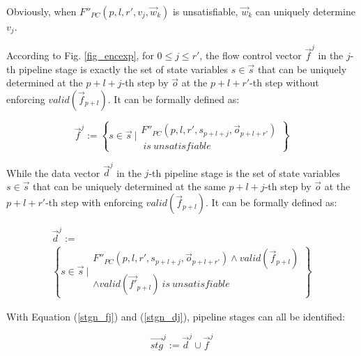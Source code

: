 \documentclass[conference]{IEEEtran}
\begin{document}
Obviously,
when $F''_{PC}(p,l,r',v_j,\vec{w}_k)$ is unsatisfiable,
$\vec{w}_k$ can uniquely determine $v_j$.

According to Fig. \ref{fig_encexp},
for $0\le j\le r'$,
the flow control vector $\vec{f}^j$ in the $j$-th pipeline stage
is exactly the set of state variables $s\in \vec{s}$ 
that can be uniquely determined at the $p+l+j$-th step by $\vec{o}$ 
at the $p+l+r'$-th step without enforcing $valid(\vec{f}_{p+l})$.
It can be formally defined as:

\begin{equation}\label{stgn_fj}
\vec{f}^{j} := 
 \left\{
 s\in \vec{s} ~| 
\begin{array}{cc}
 F''_{PC}(p,l,r',s_{p+l+j},\vec{o}_{p+l+r'})\\
 ~is~unsatisfiable
\end{array}
\right\}
\end{equation}

% 

While the data vector $\vec{d}^j$ in the $j$-th pipeline stage 
is the set of state variables $s\in \vec{s}$ 
that can be uniquely determined at the same $p+l+j$-th step 
by $\vec{o}$ at the $p+l+r'$-th step with enforcing $valid(\vec{f}_{p+l})$.
It can be formally defined as:

\begin{multline}\label{stgn_dj}
\vec{d}^{j} := \\
 \left\{
 s\in \vec{s} ~| 
 \begin{array}{cc}
 F''_{PC}(p,l,r',s_{p+l+j},\vec{o}_{p+l+r'})\wedge valid(\vec{f}_{p+l})\\
 \wedge valid(\vec{f'}_{p+l})~is~unsatisfiable
 \end{array}
\right\}
\end{multline}

With Equation (\ref{stgn_fj}) and (\ref{stgn_dj}),
pipeline stages can all be identified:

\begin{equation}
 \vec{stg}^j := \vec{d}^j\cup\vec{f}^j
\end{equation}
\end{document}
